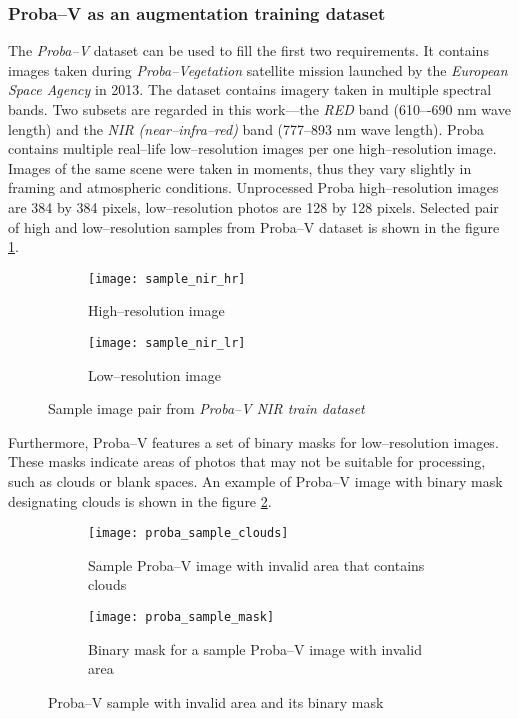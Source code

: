 \subsubsection{Proba--V as an augmentation training dataset}
The \textit{Proba--V} dataset \cite{esa-proba} can be used to fill the first two requirements.
It contains images taken during \textit{Proba--Vegetation} satellite mission launched by the \textit{European Space Agency} in 2013.
The dataset contains imagery taken in multiple spectral bands.
Two subsets are regarded in this work---the \textit{RED} band (610–-690 \si{\nano\meter} wave length) and the \textit{NIR (near--infra--red)} band (777--893 \si{\nano\meter} wave length).
Proba contains multiple real--life low--resolution images per one high--resolution image.
Images of the same scene were taken in moments, thus they vary slightly in framing and atmospheric conditions.
Unprocessed Proba high--resolution images are 384 by 384 pixels, low--resolution photos are 128 by 128 pixels.
Selected pair of high and low--resolution samples from Proba--V dataset is shown in the figure \ref{fig:proba-sample}.
\begin{figure}
    \begin{subfigure}{0.45\textwidth}
        \centering
        \texttt{[image: sample\_nir\_hr]}
        \caption{High--resolution image}
    \end{subfigure}
    \hfill
    \begin{subfigure}{0.45\textwidth}
        \centering
        \texttt{[image: sample\_nir\_lr]}
        \caption{Low--resolution image}
    \end{subfigure}
    \caption{Sample image pair from \textit{Proba--V NIR train dataset}}
    \label{fig:proba-sample}
\end{figure}
Furthermore, Proba--V features a set of binary masks for low--resolution images.
These masks indicate areas of photos that may not be suitable for processing, such as clouds or blank spaces.
An example of Proba--V image with binary mask designating clouds is shown in the figure \ref{fig:proba_sample_mask}.
\begin{figure}
    \begin{subfigure}{0.45\textwidth}
        \centering
        \texttt{[image: proba\_sample\_clouds]}
        \caption{Sample Proba--V image with invalid area that contains clouds}
    \end{subfigure}
    \hfill
    \begin{subfigure}{0.45\textwidth}
        \centering
        \texttt{[image: proba\_sample\_mask]}
        \caption{Binary mask for a sample Proba--V image with invalid area}
    \end{subfigure}
    \caption{Proba--V sample with invalid area and its binary mask}
    \label{fig:proba_sample_mask}
\end{figure}


